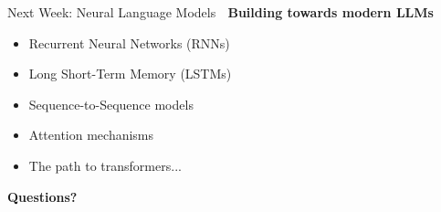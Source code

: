 \documentclass[aspectratio=169]{beamer}
\begin{document}
\begin{frame}{Next Week: Neural Language Models 🧠}
\textbf{Building towards modern LLMs}

\vspace{1em}

\begin{itemize}\setlength{\itemsep}{0pt}
    \item Recurrent Neural Networks (RNNs)
    \item Long Short-Term Memory (LSTMs)
    \item Sequence-to-Sequence models
    \item Attention mechanisms
    \item The path to transformers...
\end{itemize}

\vspace{1em}

\begin{center}
\Large
\textbf{Questions?} 🙋
\end{center}
\end{frame}
\end{document}

